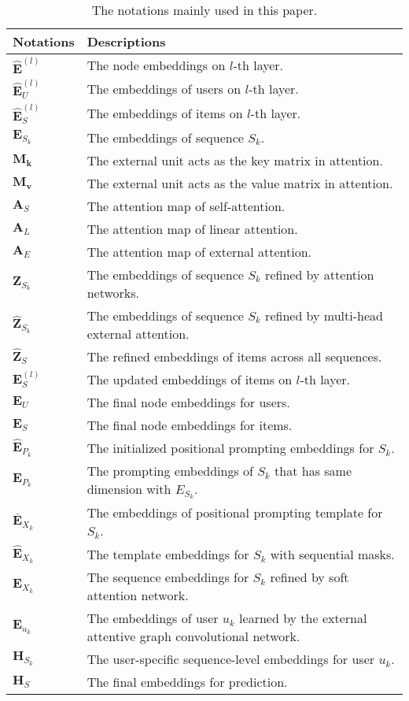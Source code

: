 \begin{table}[b]
\centering
\caption{The notations mainly used in this paper.}
\label{tab:notations}
\footnotesize
\begin{tabular}
{p{2cm}|p{8.5cm}}%
\toprule
\midrule
\textbf{Notations} &  \textbf{Descriptions} \\ 
\midrule
$\hat{\bm{E}}^{(l)}$ & The node embeddings on $l$-th layer. \\
$\hat{\bm{E}}_{U}^{(l)}$ & The embeddings of users on $l$-th layer. \\
$\hat{\bm{E}}_{S}^{(l)}$ & The embeddings of items on $l$-th layer. \\
$\bm{E}_{S_k}$ & The embeddings of sequence $S_k$. \\
$\bm{M_k}$ & The external unit acts as the key matrix in attention. \\
$\bm{M_v}$ & The external unit acts as the value matrix in attention.\\
$\bm{A}_{S}$ & The attention map of self-attention.\\
$\bm{A}_{L}$ & The attention map of linear attention.\\
$\bm{A}_{E}$ & The attention map of external attention.\\
$\bm{Z}_{S_k}$ & The embeddings of sequence $S_k$ refined by attention networks. \\
$\bm{\hat{Z}}_{S_k}$ & The embeddings of sequence $S_k$ refined by multi-head external attention. \\
$\bm{\hat{Z}}_{S}$ & The refined embeddings of items across all sequences. \\
$\bm{E}_{S}^{(l)}$ & The updated embeddings of items on $l$-th layer. \\
$\bm{E}_{U}$ & The final node embeddings for users. \\
$\bm{E}_{S}$ & The final node embeddings for items. \\
$\hat{\bm{E}}_{P_k}$ & The initialized positional prompting embeddings for $S_k$. \\
$\bm{E}_{P_k}$ & The prompting embeddings of $S_k$ that has same dimension with $E_{S_k}$. \\
$\bar{\bm{E}}_{X_k}$ & The embeddings of positional prompting template for $S_k$. \\
$\hat{\bm{E}}_{X_k}$ & The template embeddings for $S_k$ with sequential masks. \\
$\bm{E}_{X_k}$ & The sequence embeddings for $S_k$ refined by soft attention network. \\
$\bm{E}_{u_k}$ & The embeddings of user $u_k$ learned by the external attentive graph convolutional network.\\
$\bm{H}_{S_k}$ & The user-specific sequence-level embeddings for user $u_k$. \\
$\bm{H}_{S}$ & The final embeddings for prediction. \\
\midrule
\bottomrule
\end{tabular}
\end{table}